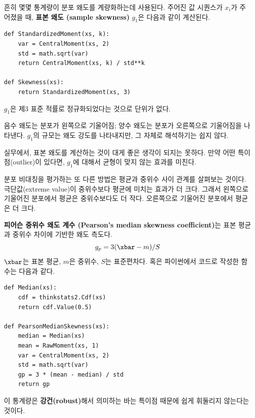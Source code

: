 
흔히 몇몇 통계량이 분포 왜도를 계량화하는데 사용된다.
주어진 값 시퀀스가 $x_i$가 주어졌을 때, 
{\bf 표본 왜도 (sample skewness)} $g_1$은 다음과 같이 계산된다.

\begin{verbatim}
def StandardizedMoment(xs, k):
    var = CentralMoment(xs, 2)
    std = math.sqrt(var)
    return CentralMoment(xs, k) / std**k

def Skewness(xs):
    return StandardizedMoment(xs, 3)
\end{verbatim}

$g_1$은 제3 표준 적률로 정규화되었다는 것으로 단위가 없다.

음수 왜도는 분포가 왼쪽으로 기울어짐; 양수 왜도는 분포가 오른쪽으로 기울어짐을 
나타낸다. $g_1$의 규모는 왜도 강도를 나타내지만, 그 자체로 해석하기는 쉽지 않다.

실무에서, 표본 왜도를 계산하는 것이 대게 좋은 생각이 되지는 못하다.
만약 어떤 특이점(outlier)이 있다면, $g_1$에 대해서 균형이 맞지 않는 효과를 미친다.

분포 비대칭을 평가하는 또 다른 방법은 평균과 중위수 사이 관계를 살펴보는 것이다.
극단값(extreme value)이 중위수보다 평균에 미치는 효과가 더 크다. 그래서 왼쪽으로 기울어진
분포에서 평균은 중위수보다도 더 작다. 오른쪽으로 기울어진 분포에서 평균은 더 크다.




{\bf 피어슨 중위수 왜도 계수 (Pearson's median skewness coefficient)}는
 표본 평균과 중위수 차이에 기반한 왜도 측도다.
%
\[ g_p = 3 (\xbar - m) / S \]
%
$\xbar$는 표본 평균, $m$은 중위수, $S$는 표준편차다.
혹은 파이썬에서 코드로 작성한 함수는 다음과 같다.

\begin{verbatim}
def Median(xs):
    cdf = thinkstats2.Cdf(xs)
    return cdf.Value(0.5)

def PearsonMedianSkewness(xs):
    median = Median(xs)
    mean = RawMoment(xs, 1)
    var = CentralMoment(xs, 2)
    std = math.sqrt(var)
    gp = 3 * (mean - median) / std
    return gp
\end{verbatim}

이 통계량은 {\bf 강건(robust)}해서 의미하는 바는 특이점 때문에 쉽게 휘둘리지 않는다는 것이다.

